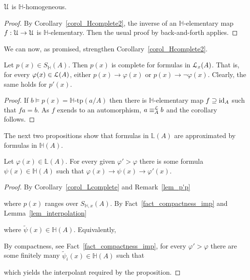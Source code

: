 \documentclass[11pt,oneside]{amsart}
\begin{document}
\begin{proposition}
  ${\EuScript U}$ is $\mathds{H}$-homogeneous.
\end{proposition}

\begin{proof}
  By Corollary~\ref{corol_Hcomplete2}, the inverse of an $\mathds{H}$-elementary map $f:{\EuScript U}\to{\EuScript U}$ is $\mathds{H}$-elementary.
  Then the usual proof by back-and-forth applies.
\end{proof}

We can now, as promised, strengthen Corollary~\ref{corol_Hcomplete2}.

\begin{corollary}\label{corol_Lcomplete}
  Let $p(x)\in S_\mathds{H}(A)$.
  Then $p(x)$ is complete for formulas in ${\EuScript L}_x(A)$.
  That is, for every $\varphi(x)\in{\EuScript L}(A)$, either $p(x)\rightarrow\varphi(x)$ or $p(x)\rightarrow\neg\varphi(x)$.
  Clearly, the same holds for $p'(x)$.
\end{corollary}

\begin{proof}
  If $b\models p(x)=\mathds{H}\mbox{-tp}(a/A)$ then there is $\mathds{H}$-elementary map $f\supseteq{\rm id}_A$ such that $fa=b$.
  As $f$ exends to an automorphism, $a\equiv^{\EuScript L}_Ab$ and the corollary follows.
\end{proof}

The next two propositions show that formulas in $\mathds{L}(A)$ are approximated by formulas in $\mathds{H}(A)$.

\begin{proposition}\label{prop_LHapprox1}
  Let $\varphi(x)\in\mathds{L}(A)$.
  For every given $\varphi'>\varphi$ there is some formula $\psi(x)\in\mathds{H}(A)$ such that $\varphi(x)\rightarrow\psi(x)\rightarrow\varphi'(x)$.
\end{proposition}

\begin{proof}
  By Corollary~\ref{corol_Lcomplete} and Remark~\ref{lem_p'p}


  where $p(x)$ ranges over $S_{\mathds{H},x}(A)$.
  By Fact~\ref{fact_compactness_imp} and Lemma~\ref{lem_interpolation}


  where $\tilde{\psi}(x)\in\mathds{H}(A)$.
  Equivalently,


  By compactness, see Fact~\ref{fact_compactness_imp}, for every $\varphi'>\varphi$ there are some finitely many $\tilde{\psi}_i(x)\in\mathds{H}(A)$ such that


  which yields the interpolant required by the proposition.
\end{proof}
\end{document}
